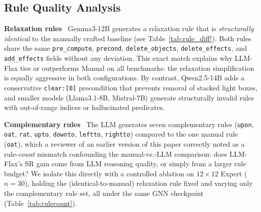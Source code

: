 \documentclass[letterpaper, 10pt, journal, twoside]{IEEEtran}
\newcommand{\tref}[1]{Table~\ref{#1}}
\newcommand{\myparagraph}[1]{\noindent\textbf{#1}~}
\newcommand{\method}{LLM-Flax\xspace}
\begin{document}
\subsection{Rule Quality Analysis}
\label{sec:quality}

\myparagraph{Relaxation rules}
Gemma3-12B generates a relaxation rule that is \emph{structurally identical} to the manually crafted baseline (see \tref{tab:rule_diff}).
Both rules share the same \texttt{pre\_compute}, \texttt{precond}, \texttt{delete\_objects}, \texttt{delete\_effects}, and \texttt{add\_effects} fields without any deviation.
This exact match explains why \method ties or outperforms Manual on all benchmarks: the relaxation simplification is equally aggressive in both configurations.
By contrast, Qwen2.5-14B adds a conservative \texttt{clear:[0]} precondition that prevents removal of stacked light boxes, and smaller models (Llama3.1-8B, Mistral-7B) generate structurally invalid rules with out-of-range indices or hallucinated predicates.

\begin{table}[t]
    \centering
    \caption{Relaxation rule preconditions generated by each model vs.\ the manual baseline.
    Gemma3-12B (the primary model) produces an exact match; others deviate.}
    \label{tab:rule_diff}
\end{table}

\myparagraph{Complementary rules}
The LLM generates seven complementary rules (\texttt{upon}, \texttt{oat}, \texttt{rat}, \texttt{upto}, \texttt{downto}, \texttt{leftto}, \texttt{rightto}) compared to the one manual rule (\texttt{oat}), which a reviewer of an earlier version of this paper correctly noted as a rule-\emph{count} mismatch confounding the manual-vs.-LLM comparison: does \method's SR gain come from LLM reasoning quality, or simply from a larger rule budget?
We isolate this directly with a controlled ablation on $12{\times}12$ Expert ($n{=}30$), holding the (identical-to-manual) relaxation rule fixed and varying only the complementary rule set, all under the same GNN checkpoint (\tref{tab:rulecount}).
\end{document}
